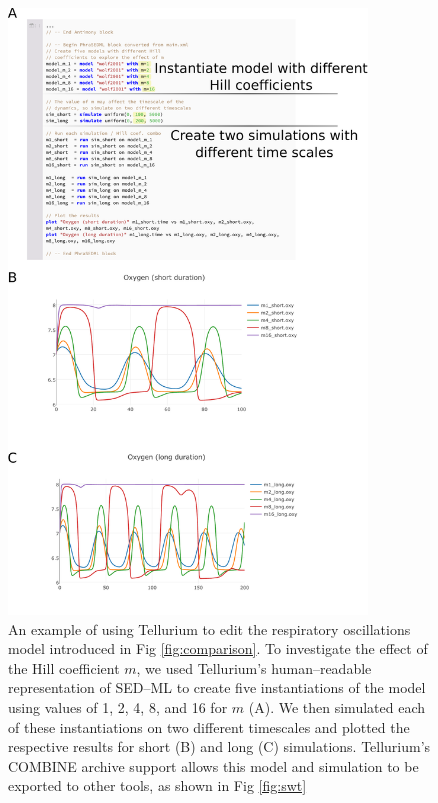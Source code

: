 \documentclass[10pt,letterpaper]{article}
\begin{document}
\begin{figure}
  \includegraphics[width=0.85\textwidth]{fig-hill2.pdf}
  \caption{An example of using Tellurium to edit the respiratory oscillations model introduced in Fig \ref{fig:comparison}. To investigate the effect of the Hill coefficient $m$, we used Tellurium's human--readable representation of SED--ML to create five instantiations of the model using values of 1, 2, 4, 8, and 16 for $m$ (A). We then simulated each of these instantiations on two different timescales and plotted the respective results for short (B) and long (C) simulations. Tellurium's COMBINE archive support allows this model and simulation to be exported to other tools, as shown in Fig \ref{fig:swt} }
  \label{fig:hill}
\end{figure}

\end{document}
